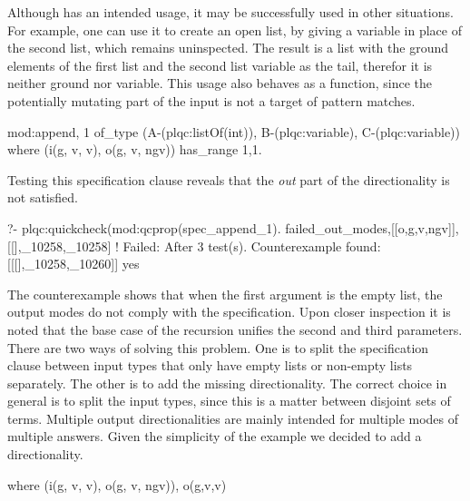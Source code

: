 Although  has an intended usage, it may be successfully
used in other situations.
%
For example, one can use it to create an open list, by giving a variable
in place of the second list, which remains uninspected.
%
The result is a list with the ground elements of the first list and the
second list variable as the tail, therefor it is neither ground nor
variable.
%
This usage also behaves as a function, since the potentially mutating
part of the input is not a target of pattern matches.
%
\begin{yapcode}
 {mod:append, 1}
   of_type (A-(plqc:listOf(int)),
     B-(plqc:variable), C-(plqc:variable))
   where (i(g, v, v), o(g, v, ngv))
   has_range {1,1}.
\end{yapcode}
%
Testing this specification clause reveals that the \emph{out} part of
the directionality is not satisfied.
\begin{yapcode}
  ?- plqc:quickcheck(mod:qcprop(spec_append_1).
 {failed_out_modes,[[o,g,v,ngv]],
                   [[],_10258,_10258]}
 !
 Failed: After 3 test(s).
 Counterexample found: [[[],_10258,_10260]] 
 yes
\end{yapcode}
%
The counterexample shows that when the first argument is the empty
list, %
the output modes do not comply with
the specification.
%
Upon closer inspection it is noted that the base case of the recursion
unifies the second and third parameters.
%
There are two %
ways of solving this problem.
%
One is to split the specification clause between input types that only
have empty lists or non-empty lists separately.
%
The other is to add the missing directionality.
%
The correct choice in general is to split the input types, since this is
a matter between disjoint sets of terms.
%
Multiple output directionalities are mainly intended for multiple modes
of multiple answers.
%
Given the simplicity of the example we decided to add a directionality.
%
\begin{yapcode}
   where (i(g, v, v), o(g, v, ngv)), o(g,v,v)
\end{yapcode}



